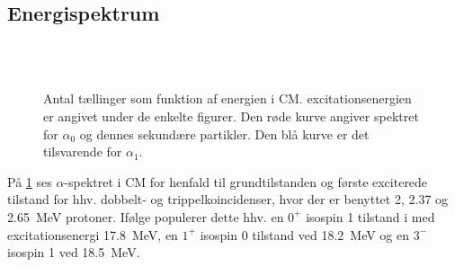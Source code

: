 \subsection{Energispektrum}
\label{sec:energispektrum}


\begin{figure}[h!]
  \centering
  \vspace{-0.3cm}
  \hfill
  \\
  \hfill
  \\
  \hfill
  \caption{Antal tællinger som funktion af energien i CM. \Carb excitationsenergien er angivet under de
    enkelte figurer. Den røde kurve angiver spektret for $\alpha_{0}$ og dennes sekundære partikler. Den
    blå kurve er det tilsvarende for $\alpha_{1}$.}
  \label{fig:alpha-spec}
  \vspace{-1.3cm}
\end{figure}

På \cref{fig:alpha-spec} ses $\alpha$-spektret i CM for henfald til grundtilstanden og første exciterede
tilstand for hhv. dobbelt- og trippelkoincidenser, hvor der er benyttet 2, \num{2.37} og
\SI{2.65}{\MeV} protoner. Ifølge \cite{States} populerer dette hhv.  en $0^{+}$ isospin 1 tilstand i
\Carb med excitationsenergi \SI{17.8}{\MeV}, en $1^{+}$ isospin 0 tilstand ved \SI{18.2}{\MeV} og en
$3^{-}$ isospin 1 ved \SI{18.5}{\MeV}.

